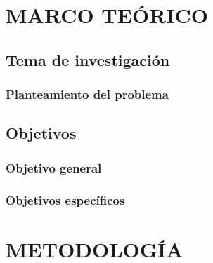 \documentclass{tesis}
\begin{document}



\setcounter{page}{2}
% 
% 
% 
% 
% 
% 

% 
% 


\newpage
\renewcommand{\thepage}{\arabic{page}}%
\setcounter{page}{1}

\chapter{MARCO TEÓRICO}

\section{Tema de investigación}
 {\MakeUppercase\tema}

\subsection{Planteamiento del problema}





\section{Objetivos}
\subsection{Objetivo general}


\subsection{Objetivos específicos}


\chapter{METODOLOGÍA}
\end{document}
